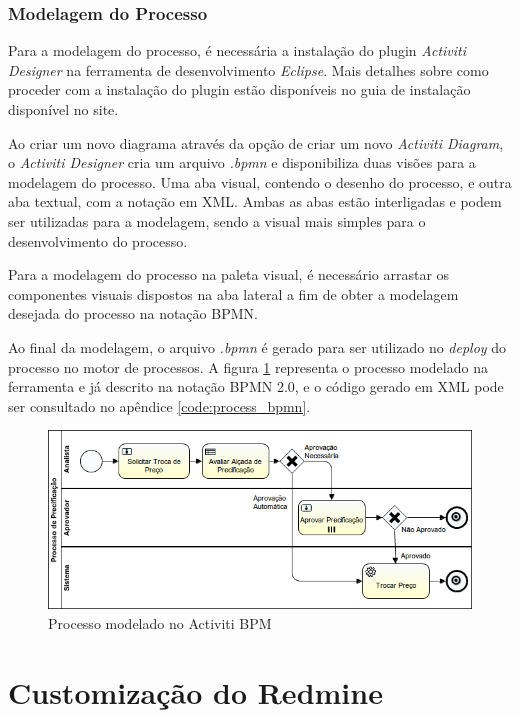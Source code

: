 \subsubsection{Modelagem do Processo}\label{sec:automatizacao_processos-modelagem_processo}

Para a modelagem do processo, é necessária a instalação do plugin \textit{Activiti Designer} na ferramenta de desenvolvimento \textit{Eclipse}\cite{eclipse}. Mais detalhes sobre como proceder com a instalação do plugin estão disponíveis no guia de instalação disponível no site\cite{activiti_designer}.

Ao criar um novo diagrama através da opção de criar um novo \textit{Activiti Diagram}, o \textit{Activiti Designer} cria um arquivo \textit{.bpmn} e disponibiliza duas visões para a modelagem do processo. Uma aba visual, contendo o desenho do processo, e outra aba textual, com a notação em XML. Ambas as abas estão interligadas e podem ser utilizadas para a modelagem, sendo a visual mais simples para o desenvolvimento do processo.

Para a modelagem do processo na paleta visual, é necessário arrastar os componentes visuais dispostos na aba lateral a fim de obter a modelagem desejada do processo na notação BPMN.

Ao final da modelagem, o arquivo \textit{.bpmn} é gerado para ser utilizado no \textit{deploy} do processo no motor de processos. A figura \ref{fig:processo_precificacao} representa o processo modelado na ferramenta e já descrito na notação BPMN 2.0, e o código gerado em XML pode ser consultado no apêndice \ref{code:process_bpmn}.

\begin{figure}[H]
\centering
\includegraphics[width=1.0\textwidth]{imagens/ProcessoDePrecificacao}
\caption{Processo modelado no Activiti BPM}
\label{fig:processo_precificacao}
\end{figure}

\section{Customização do Redmine}\label{sec:integracao_redmine_activiti-implementacao}

